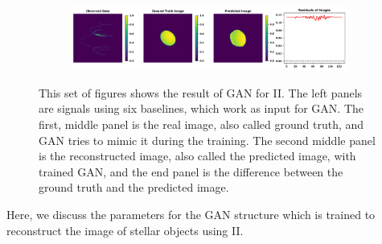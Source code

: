\begin{figure}
\begin{subfigure}{\linewidth}
	\end{subfigure}
	\begin{subfigure}{\linewidth}
		\includegraphics[width=\linewidth]{fig/testing_image/image_47.png}
	\end{subfigure}
	\caption{This set of figures shows the result of GAN for II. The left panels are signals using six baselines, which work as input for GAN. The first, middle panel is the real image, also called ground truth, and GAN tries to mimic it during the training. The second middle panel is the reconstructed image, also called the predicted image, with trained GAN, and the end panel is the difference between the ground truth and the predicted image.}
	\label{fig:GAN}
\end{figure}
Here, we discuss the parameters for the GAN structure which is trained to reconstruct the image of stellar objects using II.
